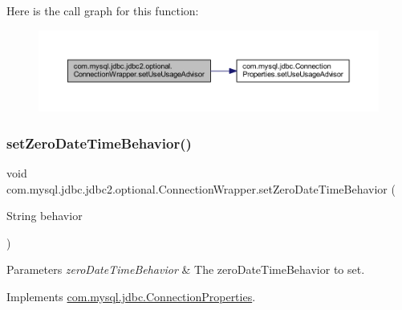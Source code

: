Here is the call graph for this function\+:
\nopagebreak
\begin{figure}[H]
\begin{center}
\leavevmode
\includegraphics[width=350pt]{classcom_1_1mysql_1_1jdbc_1_1jdbc2_1_1optional_1_1_connection_wrapper_a1d58ba31c123593e3f79773f45777674_cgraph}
\end{center}
\end{figure}
\mbox{\label{classcom_1_1mysql_1_1jdbc_1_1jdbc2_1_1optional_1_1_connection_wrapper_a5514653da00c94961479c2ad44b0cc5f}} 
\subsubsection{\texorpdfstring{set\+Zero\+Date\+Time\+Behavior()}{setZeroDateTimeBehavior()}}
{\footnotesize\ttfamily void com.\+mysql.\+jdbc.\+jdbc2.\+optional.\+Connection\+Wrapper.\+set\+Zero\+Date\+Time\+Behavior (\begin{DoxyParamCaption}\item[{String}]{behavior }\end{DoxyParamCaption})}


\begin{DoxyParams}{Parameters}
{\em zero\+Date\+Time\+Behavior} & The zero\+Date\+Time\+Behavior to set. \\
\hline
\end{DoxyParams}


Implements \mbox{\hyperlink{interfacecom_1_1mysql_1_1jdbc_1_1_connection_properties_a985e00fab1822f34c53443de78f7f597}{com.\+mysql.\+jdbc.\+Connection\+Properties}}.

